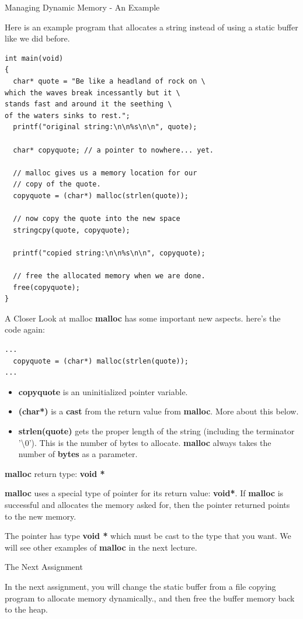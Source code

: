 \documentclass[10pt]{beamer}
\begin{document}
\begin{frame}[fragile]{Managing Dynamic Memory - An Example}

Here is an example program that allocates a string instead of using a static buffer like we did before.
\fontsize{8pt}{8pt}
\selectfont
\begin{verbatim}
int main(void)
{
  char* quote = "Be like a headland of rock on \
which the waves break incessantly but it \
stands fast and around it the seething \
of the waters sinks to rest.";
  printf("original string:\n\n%s\n\n", quote);

  char* copyquote; // a pointer to nowhere... yet.

  // malloc gives us a memory location for our
  // copy of the quote.
  copyquote = (char*) malloc(strlen(quote));

  // now copy the quote into the new space
  stringcpy(quote, copyquote);

  printf("copied string:\n\n%s\n\n", copyquote);
  
  // free the allocated memory when we are done.
  free(copyquote);
}
\end{verbatim}

\end{frame}
\begin{frame}[fragile]{A Closer Look at malloc}
\textbf{malloc} has some important new aspects.  here's the code again:

\begin{verbatim}
...
  copyquote = (char*) malloc(strlen(quote));
...
\end{verbatim}

\begin{itemize}
\item \textbf{copyquote} is an uninitialized pointer variable.
\item \textbf{(char*)} is a \textbf{cast} from the return value from \textbf{malloc}. More about this below.
\item \textbf{strlen(quote)} gets the proper length of the string (including the terminator '\textbackslash 0').  This is the number of bytes to allocate.  \textbf{malloc} always takes the number of \textbf{bytes} as a parameter.
\end{itemize}

\end{frame}
\begin{frame}[fragile]{\textbf{malloc} return type: \textbf{void *}}

\textbf{malloc} uses a special type of pointer for its return value: \textbf{void*}. If \textbf{malloc} is successful and allocates the memory asked for, then the pointer returned points to the new memory.

The pointer has type \textbf{void *} which must be cast to the type that you want.  We will see other examples of \textbf{malloc} in the next lecture.

\end{frame}
\begin{frame}[fragile]{The Next Assignment}

In the next assignment, you will change the static buffer from a file copying program to allocate memory dynamically., and then free the buffer memory back to the heap.

\end{frame}
\end{document}

